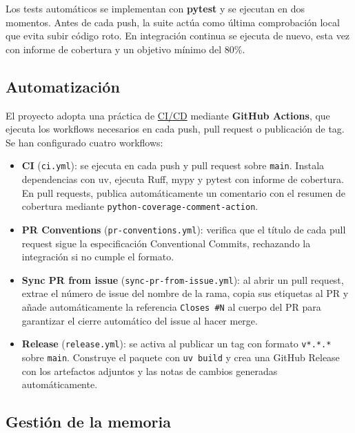 Los tests automáticos se implementan con \textbf{pytest} \cite{pytestDocs} y se
ejecutan en dos momentos. Antes de cada push, la suite actúa como última
comprobación local que evita subir código roto. En integración continua se ejecuta
de nuevo, esta vez con informe de cobertura y un objetivo mínimo del 80\%.

\subsection{Automatización}

El proyecto adopta una práctica de \hyperlink{cicd}{CI/CD} mediante
\textbf{GitHub Actions}, que ejecuta los workflows necesarios en cada push,
pull request o publicación de tag. Se han configurado cuatro workflows:

\begin{itemize}
    \item \textbf{CI} (\texttt{ci.yml}): se ejecuta en cada push y pull request
    sobre \texttt{main}. Instala dependencias con uv, ejecuta Ruff, mypy y
    pytest con informe de cobertura. En pull requests, publica automáticamente
    un comentario con el resumen de cobertura mediante
    \texttt{python-coverage-comment-action}.

    \item \textbf{PR Conventions} (\texttt{pr-conventions.yml}): verifica que
    el título de cada pull request sigue la especificación Conventional Commits,
    rechazando la integración si no cumple el formato.

    \item \textbf{Sync PR from issue} (\texttt{sync-pr-from-issue.yml}): al
    abrir un pull request, extrae el número de issue del nombre de la rama,
    copia sus etiquetas al PR y añade automáticamente la referencia
    \texttt{Closes \#N} al cuerpo del PR para garantizar el cierre automático
    del issue al hacer merge.

    \item \textbf{Release} (\texttt{release.yml}): se activa al publicar un
    tag con formato \texttt{v*.*.*} sobre \texttt{main}. Construye el paquete
    con \texttt{uv build} y crea una GitHub Release con los artefactos
    adjuntos y las notas de cambios generadas automáticamente.
\end{itemize}

\subsection{Gestión de la memoria}


